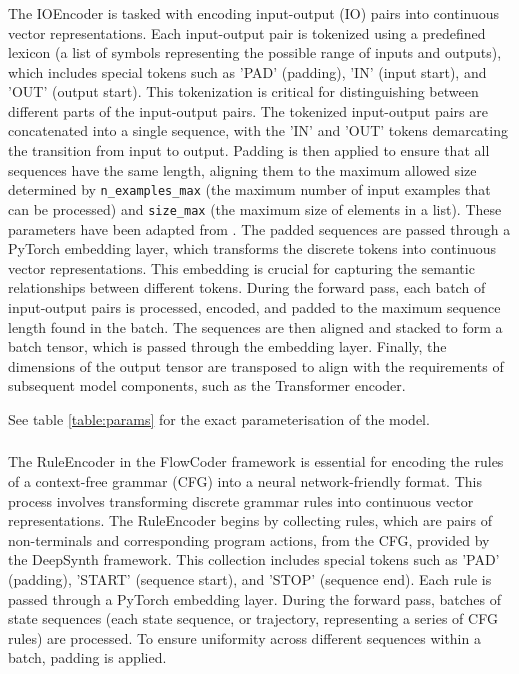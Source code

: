 \subsubsection{} \label{sec:ioencoder}
The IOEncoder is tasked with encoding input-output (IO) pairs into continuous vector representations.
Each input-output pair is tokenized using a predefined lexicon (a list of symbols representing the possible range of inputs and outputs), which includes special tokens such as 'PAD' (padding), 'IN' (input start), and 'OUT' (output start). This tokenization is critical for distinguishing between different parts of the input-output pairs.
The tokenized input-output pairs are concatenated into a single sequence, with the 'IN' and 'OUT' tokens demarcating the transition from input to output. Padding is then applied to ensure that all sequences have the same length, aligning them to the maximum allowed size determined by \texttt{n\_examples\_max} (the maximum number of input examples that can be processed) and \texttt{size\_max} (the maximum size of elements in a list). These parameters have been adapted from \cite{fijalkow_scaling_2021}.
The padded sequences are passed through a PyTorch embedding layer, which transforms the discrete tokens into continuous vector representations. This embedding is crucial for capturing the semantic relationships between different tokens.
During the forward pass, each batch of input-output pairs is processed, encoded, and padded to the maximum sequence length found in the batch. The sequences are then aligned and stacked to form a batch tensor, which is passed through the embedding layer. Finally, the dimensions of the output tensor are transposed to align with the requirements of subsequent model components, such as the Transformer encoder.

See table \ref{table:params} for the exact parameterisation of the model.


\subsubsection{}\label{sec:ruleencoder}
The RuleEncoder in the FlowCoder framework is essential for encoding the rules of a context-free grammar (CFG) into a neural network-friendly format. This process involves transforming discrete grammar rules into continuous vector representations.
The RuleEncoder begins by collecting rules, which are pairs of non-terminals and corresponding program actions, from the CFG, provided by the DeepSynth framework. This collection includes special tokens such as 'PAD' (padding), 'START' (sequence start), and 'STOP' (sequence end). Each rule is passed through a PyTorch embedding layer.
During the forward pass, batches of state sequences (each state sequence, or trajectory, representing a series of CFG rules) are processed.
To ensure uniformity across different sequences within a batch, padding is applied.


